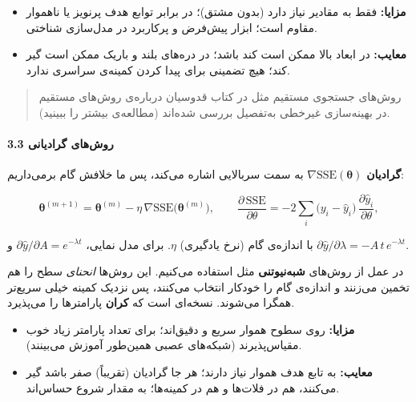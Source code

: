 \begin{itemize}
\tightlist
\item
  \textbf{مزایا:} فقط به مقادیر  نیاز دارد (بدون مشتق)؛ در برابر
  توابع هدف پرنویز یا ناهموار مقاوم است؛ ابزار پیش‌فرض و پرکاربرد در
  مدل‌سازی شناختی.
\item
  \textbf{معایب:} در ابعاد بالا ممکن است کند باشد؛ در دره‌های بلند و
  باریک ممکن است گیر کند؛ هیچ تضمینی برای پیدا کردن کمینه‌ی سراسری ندارد.
\end{itemize}

\begin{quote}
روش‌های جستجوی مستقیم مثل  در کتاب قدوسیان درباره‌ی
روش‌های مستقیم در بهینه‌سازی غیرخطی به‌تفصیل بررسی شده‌اند (مطالعه‌ی بیشتر را
ببینید).
\end{quote}

\paragraph{3.3 روش‌های گرادیانی}

\textbf{گرادیان} \(\nabla \mathrm{SSE}(\boldsymbol\theta)\) به سمت
سربالایی اشاره می‌کند، پس ما خلافش گام برمی‌داریم:

\[
\boldsymbol\theta^{(m+1)} = \boldsymbol\theta^{(m)} - \eta\,\nabla \mathrm{SSE}\big(\boldsymbol\theta^{(m)}\big),
\qquad
\frac{\partial\,\mathrm{SSE}}{\partial \theta} = -2 \sum_{i} \big(y_i - \hat y_i\big)\,\frac{\partial \hat y_i}{\partial \theta},
\]

با اندازه‌ی گام (نرخ یادگیری) \(\eta\). برای مدل نمایی،
\(\partial \hat y/\partial A = e^{-\lambda t}\) و
\(\partial \hat y/\partial \lambda = -A\,t\,e^{-\lambda t}\).

در عمل از روش‌های \textbf{شبه‌نیوتنی}  مثل
\textbf{} استفاده می‌کنیم. این روش‌ها \emph{انحنای} سطح را هم
تخمین می‌زنند و اندازه‌ی گام را خودکار انتخاب می‌کنند، پس نزدیک کمینه خیلی
سریع‌تر همگرا می‌شوند. \textbf{} نسخه‌ای است که \textbf{کران}
پارامترها را می‌پذیرد.

\begin{itemize}
\tightlist
\item
  \textbf{مزایا:} روی سطوح هموار سریع و دقیق‌اند؛ برای تعداد پارامتر زیاد
  خوب مقیاس‌پذیرند (شبکه‌های عصبی همین‌طور آموزش می‌بینند).
\item
  \textbf{معایب:} به تابع هدف هموار نیاز دارند؛ هر جا گرادیان (تقریباً)
  صفر باشد گیر می‌کنند، هم در فلات‌ها و هم در کمینه‌ها؛ به مقدار شروع
  حساس‌اند.
\end{itemize}

